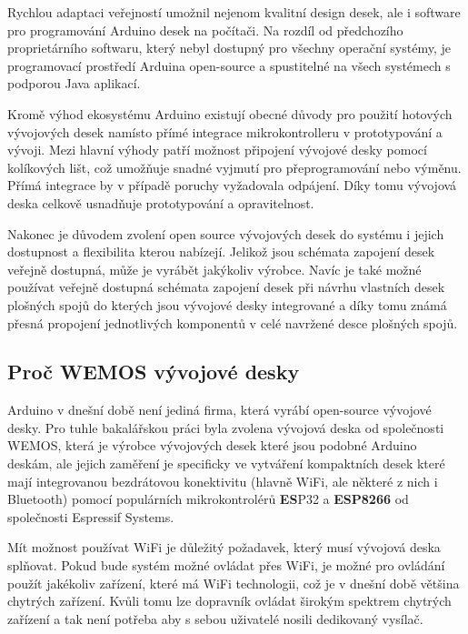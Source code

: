 Rychlou adaptaci veřejností umožnil nejenom kvalitní design desek, ale i software pro programování Arduino desek na počítači. Na rozdíl od předchozího proprietárního softwaru, který nebyl dostupný pro všechny operační systémy, je programovací prostředí Arduina open-source a spustitelné na všech systémech s podporou Java aplikací.
\cite{KnihaOArduinu}

Kromě výhod ekosystému Arduino existují obecné důvody pro použití hotových vývojových desek namísto přímé integrace mikrokontrolleru v prototypování a vývoji. Mezi hlavní výhody patří možnost připojení vývojové desky pomocí kolíkových lišt, což umožňuje snadné vyjmutí pro přeprogramování nebo výměnu. Přímá integrace by v případě poruchy vyžadovala odpájení. Díky tomu vývojová deska celkově usnadňuje prototypování a opravitelnost.

Nakonec je důvodem zvolení open source vývojových desek do systému i jejich dostupnost a flexibilita kterou nabízejí. Jelikož jsou schémata zapojení desek veřejně dostupná, může je vyrábět jakýkoliv výrobce. Navíc je také možné používat veřejně dostupná schémata zapojení desek při návrhu vlastních desek plošných spojů do kterých jsou vývojové desky integrované a díky tomu známá přesná propojení jednotlivých komponentů v celé navržené desce plošných spojů.

\subsection{Proč WEMOS vývojové desky}

Arduino v dnešní době není jediná firma, která vyrábí open-source vývojové desky. Pro tuhle bakalářskou práci byla zvolena vývojová deska od společnosti WEMOS, která je výrobce vývojových desek které jsou podobné Arduino deskám, ale jejich zaměření je specificky ve vytváření kompaktních desek které mají integrovanou bezdrátovou konektivitu (hlavně WiFi, ale některé z nich i Bluetooth) pomocí populárních mikrokontrolérů \textbf{ES}P32 a \textbf{ESP8266} od společnosti Espressif Systems.

Mít možnost používat WiFi je důležitý požadavek, který musí vývojová deska splňovat. Pokud bude systém možné ovládat přes WiFi, je možné pro ovládání použít jakékoliv zařízení, které má WiFi technologii, což je v dnešní době většina chytrých zařízení. Kvůli tomu lze dopravník ovládat širokým spektrem chytrých zařízení a tak není potřeba aby s sebou uživatelé nosili dedikovaný vysílač.

